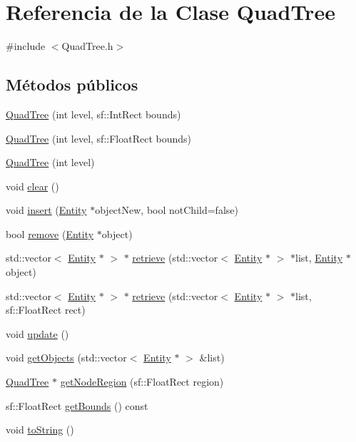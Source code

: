 \hypertarget{classQuadTree}{}\section{Referencia de la Clase Quad\+Tree}
\label{classQuadTree}


{\ttfamily \#include $<$Quad\+Tree.\+h$>$}

\subsection*{Métodos públicos}
\begin{DoxyCompactItemize}
\item 
\hyperlink{classQuadTree_a96a9d7cbe65726a19c1d04ca590eaec0}{Quad\+Tree} (int level, sf\+::\+Int\+Rect bounds)
\item 
\hyperlink{classQuadTree_a4be1f4acd98d186e6da8de3ae7470514}{Quad\+Tree} (int level, sf\+::\+Float\+Rect bounds)
\item 
\hyperlink{classQuadTree_a2c195977908b54adde1296d95e190efa}{Quad\+Tree} (int level)
\item 
void \hyperlink{classQuadTree_a0c1976706b3dd28abd50efce4024b087}{clear} ()
\item 
void \hyperlink{classQuadTree_ae4e2555bfee54d85d918306d8588a29a}{insert} (\hyperlink{classEntity}{Entity} $\ast$object\+New, bool not\+Child=false)
\item 
bool \hyperlink{classQuadTree_afe0e6b1888d77e36fde30f394ed486ec}{remove} (\hyperlink{classEntity}{Entity} $\ast$object)
\item 
std\+::vector$<$ \hyperlink{classEntity}{Entity} $\ast$ $>$ $\ast$ \hyperlink{classQuadTree_a2ed00031c45ea4ea39719070ca962e5a}{retrieve} (std\+::vector$<$ \hyperlink{classEntity}{Entity} $\ast$ $>$ $\ast$list, \hyperlink{classEntity}{Entity} $\ast$object)
\item 
std\+::vector$<$ \hyperlink{classEntity}{Entity} $\ast$ $>$ $\ast$ \hyperlink{classQuadTree_a2b96dd59f214926f73c709c52909eb3c}{retrieve} (std\+::vector$<$ \hyperlink{classEntity}{Entity} $\ast$ $>$ $\ast$list, sf\+::\+Float\+Rect rect)
\item 
void \hyperlink{classQuadTree_acf6234d19444281325a3f5c248280779}{update} ()
\item 
void \hyperlink{classQuadTree_a8fbaf5f22c673ba6b2a71d4bad669867}{get\+Objects} (std\+::vector$<$ \hyperlink{classEntity}{Entity} $\ast$ $>$ \&list)
\item 
\hyperlink{classQuadTree}{Quad\+Tree} $\ast$ \hyperlink{classQuadTree_a794eee179f8ecee537f0309357924e41}{get\+Node\+Region} (sf\+::\+Float\+Rect region)
\item 
sf\+::\+Float\+Rect \hyperlink{classQuadTree_ad74d47d7e55b4e84de85329fe1678b0d}{get\+Bounds} () const 
\item 
void \hyperlink{classQuadTree_ad2e5a59504d9574e5095a42c1a35faea}{to\+String} ()
\end{DoxyCompactItemize}


